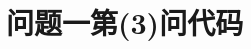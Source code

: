 \documentclass{cumcmthesis}
\begin{document}
\begin{appendices}
\begin{table}[H]
\begin{tabular}{ccc}
		\bottomrule[1.5pt]
	\end{tabular}
\end{table}	
%	
	
	\section{问题一第(3)问代码}
	

\end{appendices}
\end{document}
